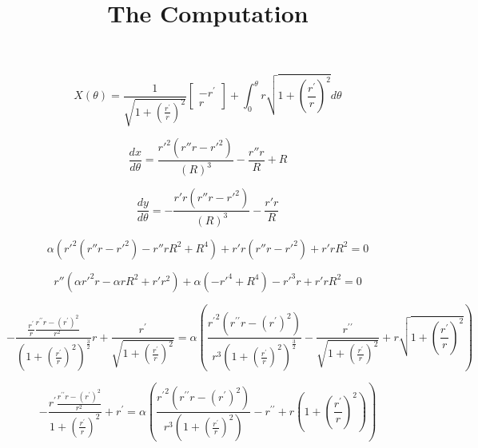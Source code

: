 \documentclass[12pt, a4paper]{report}
\title{The Computation}
\begin{document}
\maketitle

\begin{equation}
X(\theta) = \frac{1}{\sqrt{1 + \left(\frac{r^\prime}{r}\right)^2}}\begin{bmatrix} -r^\prime \\ r \end{bmatrix} + \int_0^\theta{r\sqrt{1+\left(\frac{r^\prime}{r}\right)^2}d\theta}
\end{equation}

\begin{equation}
\frac{dx}{d\theta} = \frac{{r'}^2(r''r-{r'}^2)}{(R)^3} - \frac{r''r}{R} + R
\end{equation}

\begin{equation}
\frac{dy}{d\theta} = -\frac{r'r(r''r-{r'}^2)}{(R)^3} - \frac{r'r}{R}
\end{equation}

\begin {equation}
\alpha\left({r'}^2(r''r-{r'}^2) - r''r R^2 + R^4\right) + r'r(r''r-{r'}^2) + r'r R^2 = 0
\end{equation}

\begin {equation}
r''(\alpha{r'}^2r - \alpha r R^2 + r'r^2) + \alpha(-r'^4 + R^4) - r'^3r +r'rR^2 = 0
\end{equation}



\begin{equation}
-\frac{\frac{r^\prime}{r} \frac{r^{\prime\prime}r - (r^\prime)^2}{r^2}}{({1 + \left(\frac{r^\prime}{r}\right)^2})^\frac{3}{2}}r + \frac{r^\prime}{\sqrt{1 + \left(\frac{r^\prime}{r}\right)^2}} =
\alpha \left(\frac{{r^\prime}^2 (r^{\prime\prime}r - (r^\prime)^2)}{r^3({1 + \left(\frac{r^\prime}{r}\right)^2})^\frac{3}{2}} - \frac{r^{\prime\prime}}{\sqrt{1 + \left(\frac{r^\prime}{r}\right)^2}} + r\sqrt{1+\left(\frac{r^\prime}{r}\right)^2}\right)
\end{equation}

\begin{equation}
-\frac{r^\prime \frac{r^{\prime\prime}r - (r^\prime)^2}{r^2}}{1 + \left(\frac{r^\prime}{r}\right)^2} + r^\prime =
\alpha \left(\frac{{r^\prime}^2 (r^{\prime\prime}r - (r^\prime)^2)}{r^3({1 + \left(\frac{r^\prime}{r}\right)^2})} - r^{\prime\prime} + r(1+\left(\frac{r^\prime}{r}\right)^2)\right)
\end{equation}
\end{document}
